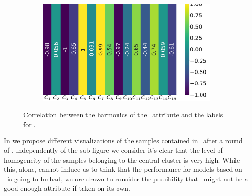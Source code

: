 \begin{figure}[!ht]
\begin{subfigure}{0.49\linewidth}
	\end{subfigure}
	\begin{subfigure}{0.49\linewidth}
		\includegraphics[width=\linewidth]{img/qlp_corr/Bn_coil3.png}
	\end{subfigure}
	\caption{Correlation between the harmonics of the \bn\ attribute and the labels for \qlp.}
	\label{fig:bn-lcorr-qlp}
\end{figure}

In  we propose different visualizations of the samples contained in \bn\
after a round of \pca. Independently of the sub-figure we consider it's clear that the level of
homogeneity of the samples belonging to the central cluster is very high. While this, alone, cannot
induce us to think that the performance for models based on \bn\ is going to be bad, we are drawn to
consider the possibility that \bn\ might not be a good enough attribute if taken on its own.


